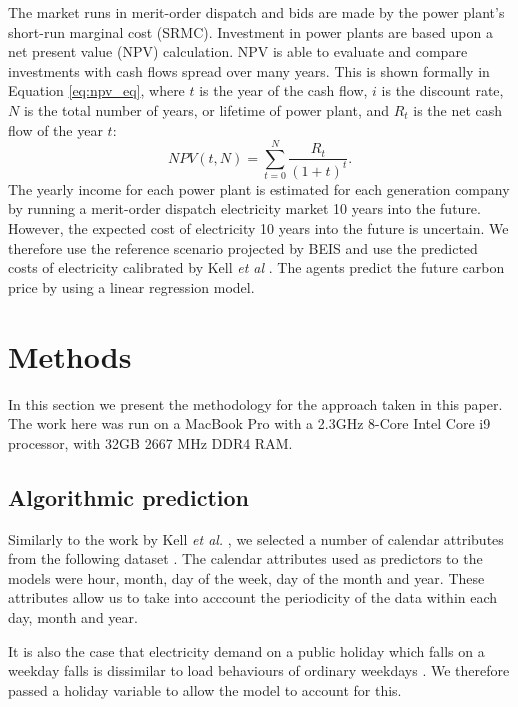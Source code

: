 \documentclass[final,3p,times,twocolumn,numbers]{elsarticle}
\begin{document}
The market runs in merit-order dispatch and bids are made by the power plant's short-run marginal cost (SRMC). Investment in power plants are based upon a net present value (NPV) calculation. NPV is able to evaluate and compare investments with cash flows spread over many years. This is shown formally in Equation \ref{eq:npv_eq}, where $t$ is the year of the cash flow, $i$ is the discount rate, $N$ is the total number of years, or lifetime of power plant, and $R_t$ is the net cash flow of the year $t$:
\begin{equation} \label{eq:npv_eq}
NPV(t, N) = \sum_{t=0}^{N}\frac{R_t}{(1+t)^t}.
\end{equation}
The yearly income for each power plant is estimated for each generation company by running a merit-order dispatch electricity market 10 years into the future. However, the expected cost of electricity 10 years into the future is uncertain. We therefore use the reference scenario projected by BEIS and use the predicted costs of electricity calibrated by Kell \textit{et al} \cite{DBEIS2019, Kell2020}. The agents predict the future carbon price by using a linear regression model.


 
\section{Methods}
\label{sec:methods}

In this section we present the methodology for the approach taken in this paper. The work here was run on a MacBook Pro with a 2.3GHz 8-Core Intel Core i9 processor, with 32GB 2667 MHz DDR4 RAM.

\subsection{Algorithmic prediction}

Similarly to the work by Kell \textit{et al.} \cite{Kell2018a}, we selected a number of calendar attributes from the following dataset \cite{gbnationalgridstatus_2019}. The calendar attributes used as predictors to the models were hour, month, day of the week, day of the month and year. These attributes allow us to take into acccount the periodicity of the data within each day, month and year.

It is also the case that electricity demand on a public holiday which falls on a weekday falls is dissimilar to load behaviours of ordinary weekdays \cite{Kim2000}. We therefore passed a holiday variable to allow the model to account for this.
\end{document}

